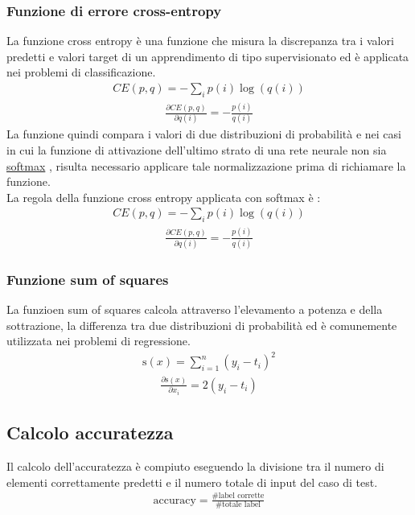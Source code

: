 \subsubsection{Funzione di errore cross-entropy}
La funzione cross entropy è una funzione che misura la discrepanza tra i valori predetti e valori target di un apprendimento di tipo supervisionato ed è applicata nei problemi di classificazione.
\begin{align*}
CE(p,q) = -\sum_{i} p(i) \log(q(i))
\end{align*}
\begin{align*}
\frac{\partial CE(p,q)}{\partial q(i)} = -\frac{p(i)}{q(i)}
\end{align*}
La funzione quindi compara i valori di due distribuzioni di probabilità e nei casi in cui la funzione di attivazione dell'ultimo strato di una rete neurale non sia \underline{softmax} , risulta necessario applicare tale normalizzazione prima di richiamare la funzione.\\
La regola della funzione cross entropy applicata con softmax è :
\begin{align*}
CE(p,q) = -\sum_{i} p(i) \log(q(i))
\end{align*}
\begin{align*}
\frac{\partial CE(p,q)}{\partial q(i)} = -\frac{p(i)}{q(i)}
\end{align*}
\subsubsection{Funzione sum of squares}
La funzioen sum of squares calcola attraverso l'elevamento a potenza e della sottrazione, la differenza tra due distribuzioni di probabilità ed è comunemente utilizzata nei problemi di regressione.
\begin{align*}
\text{s}(x) = \sum_{i=1}^{n} (y_i - t_i)^2
\end{align*}
\begin{align*}
\frac{\partial \text{s}(x)}{\partial x_i} = 2 (y_i - t_i)
\end{align*}

\subsection{Calcolo accuratezza}
Il calcolo dell'accuratezza è compiuto eseguendo la divisione tra il numero di elementi correttamente predetti e il numero totale di input del caso di test.
\begin{align*}
\text{accuracy} = \frac{\text{\# label corrette}}{\text{\# totale label}}
\end{align*}


